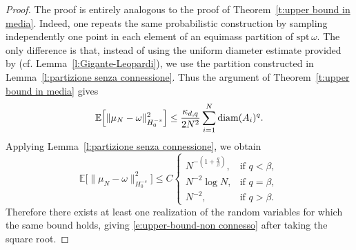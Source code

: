 \documentclass[12pt,a4paper,oneside]{amsart}
\theoremstyle{plain}
\theoremstyle{definition}
\numberwithin{equation}{section}
\numberwithin{figure}{section}
\numberwithin{table}{section}
\theoremstyle{remark}
\newcommand{\expAhlfors}{\beta}
\begin{document}
\begin{proof}
The proof is entirely analogous to the proof of Theorem~\ref{t:upper bound in media}. Indeed,
one repeats the same probabilistic construction by sampling independently one point
in each element of an equimass partition of $\mathrm{spt}\,\omega$. The only
difference is that, instead of using the uniform diameter estimate provided by \cite[Theorem 2]{GL17} (cf. Lemma~\ref{l:Gigante-Leopardi}), we use the partition constructed in
Lemma~\ref{l:partizione senza connessione}. Thus the argument of Theorem~\ref{t:upper bound in media}
gives
\begin{equation*}
    \mathbb E\Big[ \|\mu_N-\omega\|_{H_0^{-s}}^2\Big]\le\frac{\kappa_{d,q}}{2N^2}
    \sum_{i=1}^N \textup{diam}(A_i)^q .
\end{equation*}
Applying Lemma~\ref{l:partizione senza connessione}, we obtain
\begin{equation*}
    \mathbb E\Big[
        \|\mu_N-\omega\|_{H_0^{-s}}^2
    \Big]
    \le C
    \begin{cases}
        N^{-(1+\frac q{\expAhlfors})}, & \text{if } q<\expAhlfors,\\[1mm]
        N^{-2}\log N, & \text{if } q=\expAhlfors,\\[1mm]
        N^{-2}, & \text{if } q>\expAhlfors.
    \end{cases}
\end{equation*}
Therefore there exists at least one realization of the random variables for which the
same bound holds, giving \eqref{e:upper-bound-non connesso} after taking the square root.  
\end{proof}
\end{document}
